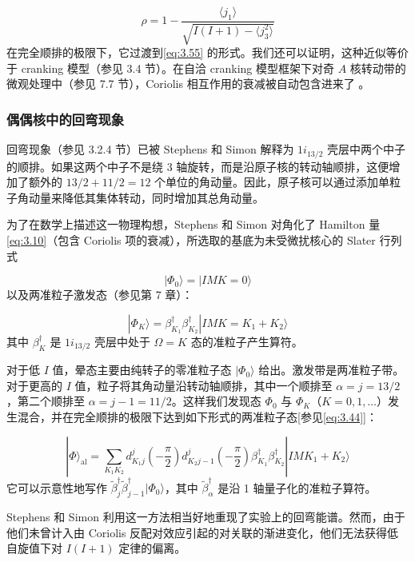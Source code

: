 \begin{equation}
\rho=1-\frac{\langle j_{1}\rangle}{\sqrt{I(I+1)-\langle j^{2}_{3}\rangle}}\label{eq:3.56}
\end{equation}
在完全顺排的极限下，它过渡到\ref{eq:3.55} 的形式。我们还可以证明，这种近似等价于 cranking 模型（参见 3.4
节）。在自洽 cranking 模型框架下对奇 $A$ 核转动带的微观处理中（参见 7.7 节），Coriolis 相互作用的衰减被自动包含进来了
\cite{RMB74,RM74}。

\subsubsection{偶偶核中的回弯现象}

回弯现象（参见 3.2.4 节）已被 Stephens 和 Simon \cite{SS72a} 解释为 $1i_{13/2}$
壳层中两个中子的顺排。如果这两个中子不是绕 3 轴旋转，而是沿原子核的转动轴顺排，这便增加了额外的 $13/2+11/2=12$
个单位的角动量。因此，原子核可以通过添加单粒子角动量来降低其集体转动，同时增加其总角动量。

为了在数学上描述这一物理构想，Stephens 和 Simon 对角化了 Hamilton 量 \ref{eq:3.10}（包含
Coriolis 项的衰减），所选取的基底为未受微扰核心的 Slater 行列式

\[
|\Phi_{0}\rangle=|IMK=0\rangle
\]
以及两准粒子激发态（参见第 7 章）：

\begin{equation}
|\Phi_{K}\rangle=\beta^{\dagger}_{K_{1}}\beta^{\dagger}_{K_{2}}|IMK=K_{1}+K_{2}\rangle\label{eq:3.57}
\end{equation}
其中 $\beta^{\dagger}_{K}$ 是 $1i_{13/2}$ 壳层中处于 $\Omega=K$ 态的准粒子产生算符。

对于低 $I$ 值，晕态主要由纯转子的零准粒子态 $|\Phi_{0}\rangle$ 给出。激发带是两准粒子带。对于更高的 $I$
值，粒子将其角动量沿转动轴顺排，其中一个顺排至 $\alpha=j=13/2$，第二个顺排至 $\alpha=j-1=11/2$。这样我们发现态
$\Phi_{0}$ 与 $\Phi_{K}$（$K=0,1,\dots$）发生混合，并在完全顺排的极限下达到如下形式的两准粒子态{[}参见\ref{eq:3.44}{]}：

\begin{equation}
|\Phi\rangle_{\text{al}}=\sum_{K_{1}K_{2}}d^{j}_{K_{1}j}\left(-\frac{\pi}{2}\right)d^{j}_{K_{2}j-1}\left(-\frac{\pi}{2}\right)\beta^{\dagger}_{K_{1}}\beta^{\dagger}_{K_{2}}|IMK_{1}+K_{2}\rangle\label{eq:3.58}
\end{equation}
它可以示意性地写作 $\tilde{\beta}^{\dagger}_{j}\tilde{\beta}^{\dagger}_{j-1}|\Phi_{0}\rangle$，其中
$\tilde{\beta}^{\dagger}_{\alpha}$ 是沿 1 轴量子化的准粒子算符。

Stephens 和 Simon \cite{SS72a} 利用这一方法相当好地重现了实验上的回弯能谱。然而，由于他们未曾计入由
Coriolis 反配对效应引起的对关联的渐进变化，他们无法获得低自旋值下对 $I(I+1)$ 定律的偏离。

